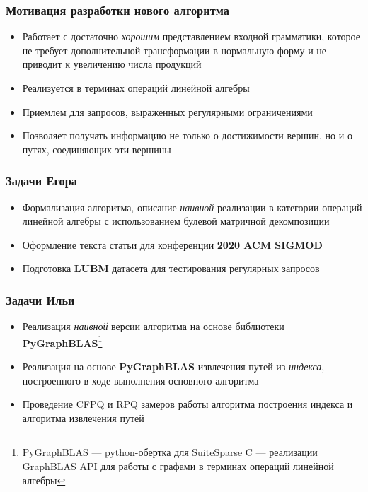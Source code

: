 \documentclass[xcolor=table,english,russian]{beamer}
\begin{document}
\begin{frame}[fragile] \frametitle{Мотивация разработки нового алгоритма}
    \begin{itemize}
        \item Работает с достаточно \textit{хорошим} представлением входной грамматики, которое не требует дополнительной трансформации в нормальную форму и не приводит к увеличению числа продукций
        \item Реализуется в терминах операций линейной алгебры
        \item Приемлем для запросов, выраженных регулярными ограничениями
        \item Позволяет получать информацию не только о достижимости вершин, но и о путях, соединяющих эти вершины
    \end{itemize}
\end{frame}

\begin{frame}[fragile] \frametitle{Задачи Егора}
    \begin{itemize}
        \item Формализация алгоритма, описание \textit{наивной} реализации в категории операций линейной алгебры с использованием булевой матричной декомпозиции
        \item Оформление текста статьи для конференции \textbf{2020 ACM SIGMOD}
        \item Подготовка \textbf{LUBM} датасета для тестирования регулярных запросов
    \end{itemize}
\end{frame}

\begin{frame}[fragile] \frametitle{Задачи Ильи}
    \begin{itemize}
        \item Реализация \textit{наивной} версии алгоритма на основе библиотеки \textbf{PyGraphBLAS}\footnote{PyGraphBLAS --- python-обертка для SuiteSparse C --- реализации GraphBLAS API для работы с графами в терминах операций линейной алгебры}
        \item Реализация на основе \textbf{PyGraphBLAS} извлечения путей из \textit{индекса}, построенного в ходе выполнения основного алгоритма
        \item Проведение CFPQ и RPQ замеров работы алгоритма построения индекса и алгоритма извлечения путей
    \end{itemize}
\end{frame}
\end{document}
